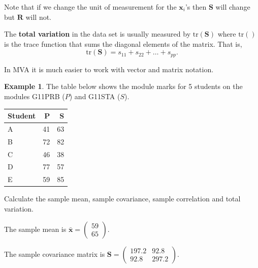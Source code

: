 \documentclass[]{book}
\theoremstyle{definition}
\theoremstyle{definition}
\newtheorem{example}{Example}[chapter]
\theoremstyle{definition}
\theoremstyle{remark}
\begin{document}
Note that if we change the unit of measurement for the \(\boldsymbol x_i\)'s then \(\boldsymbol S\) will change but \(\boldsymbol R\) will not.

The \textbf{total variation} in the data set is usually measured by \(\text{tr}(\boldsymbol S)\) where \(\text{tr}()\) is the trace function that sums the diagonal elements of the matrix. That is,
\[\text{tr}(\boldsymbol S) = s_{11} + s_{22} + \ldots + s_{pp}.\]

In MVA it is much easier to work with vector and matrix notation.

\begin{example}
\protect\hypertarget{exm:unnamed-chunk-5}{}{\label{exm:unnamed-chunk-5} }The table below shows the module marks for 5 students on the modules G11PRB (\(P\)) and G11STA (\(S\)).
\end{example}

\begin{table}[H]
\centering
\begin{tabular}{lrr}
\toprule
Student & P & S\\
\midrule
A & 41 & 63\\
B & 72 & 82\\
C & 46 & 38\\
D & 77 & 57\\
E & 59 & 85\\
\bottomrule
\end{tabular}
\end{table}

Calculate the sample mean, sample covariance, sample correlation and total variation.

The sample mean is \(\bar{\boldsymbol x} = \begin{pmatrix} 59 \\ 65 \end{pmatrix}\).

The sample covariance matrix is \(\boldsymbol S= \begin{pmatrix} 197.2 & 92.8 \\ 92.8 & 297.2 \end{pmatrix}\).
\end{document}
